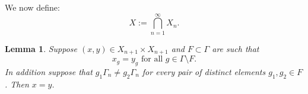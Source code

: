 \documentclass[oneside,english]{amsart}
\newtheorem{lem}[thm]{Lemma}
\theoremstyle{definition}
\begin{document}



We now define:
\begin{equation}
X:= \bigcap_{n=1}^\infty X_n.
\end{equation}






\begin{lem}\label{lem:X_n_assympt}
Suppose $(x,y) \in X_{n+1} \times X_{n+1}$ and $F \subset \Gamma$ are such that
\begin{equation}\label{eq:x_y_sim}
x_g=y_g \mbox{ for all  } g \in \Gamma \setminus F.
\end{equation}
In addition suppose that
$g_1\Gamma_n \ne g_2\Gamma_n$ for every pair of distinct elements $g_1,g_2 \in F$.
Then $x=y$.
\end{lem}
\end{document}
